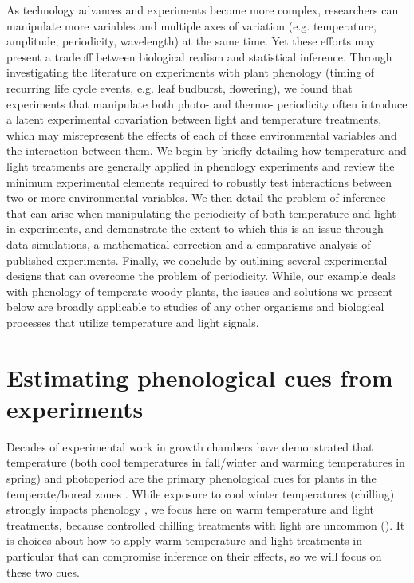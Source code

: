 \documentclass[11pt]{article}
\begin{document}
As technology advances and experiments become more complex, researchers can manipulate more variables and multiple axes of variation (e.g. temperature, amplitude, periodicity, wavelength) at the same time. Yet these efforts may present a tradeoff between biological realism and statistical inference. Through investigating the literature on experiments with plant phenology (timing of recurring life cycle events, e.g. leaf budburst, flowering), we found that experiments that manipulate both photo- and thermo- periodicity often introduce a latent experimental covariation between light and temperature treatments, which may misrepresent the effects of each of these environmental variables and the interaction between them. We begin by briefly detailing how temperature and light treatments are generally applied in phenology experiments and review the minimum experimental elements required to robustly test interactions between two or more environmental variables. We then detail the problem of inference that can arise when manipulating the periodicity of both temperature and light in experiments, and demonstrate the extent to which this is an issue through data simulations, a mathematical correction and a comparative analysis of published experiments. Finally, we conclude by outlining several experimental designs that can overcome the problem of periodicity. While, our example deals with phenology of temperate woody plants, the issues and solutions we present below are broadly applicable to studies of any other organisms and biological processes that utilize temperature and light signals. 

\section*{Estimating phenological cues from experiments}
Decades of experimental work in growth chambers have demonstrated that temperature (both cool temperatures in fall/winter and warming temperatures in spring) and photoperiod are the primary phenological cues for plants in the temperate/boreal zones \citep{Ettinger:2020aa}. While exposure to cool winter temperatures (chilling) strongly impacts phenology \citep{Laube2014}, we focus here on warm temperature and light treatments, because controlled chilling treatments with light are uncommon (\citep{limitingcues}). It is choices about how to apply warm temperature and light treatments in particular that can compromise inference on their effects, so we will focus on these two cues.
\end{document}
